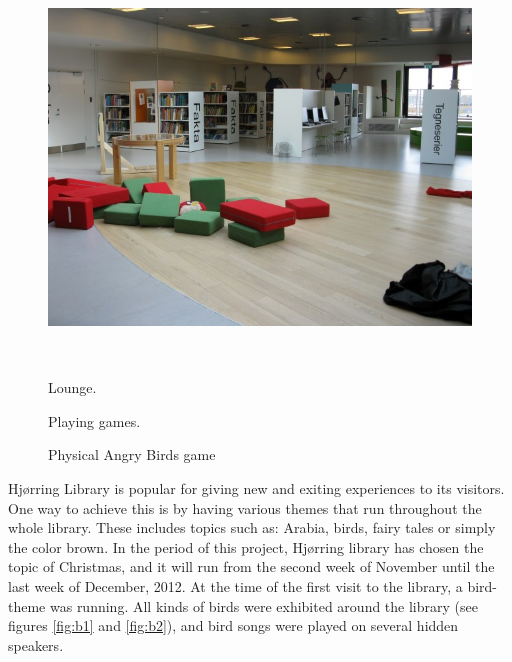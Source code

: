 \begin{figure}[htbp]
\begin{minipage}[b]{0.3\textwidth}
		\includegraphics[width=1.00\textwidth]{Pictures/HjoerringLibrary/p3.jpg} %
	\end{minipage}\\ %
	\begin{minipage}[t]{0.3\textwidth}
		\caption{Lounge.} %
		\label{fig:p1}
	\end{minipage}\hfill
	\begin{minipage}[t]{0.3\textwidth}
		\caption{Playing games.} %
		\label{fig:p2}
	\end{minipage}\hfill	
	\begin{minipage}[t]{0.3\textwidth}
		\caption{Physical Angry Birds game} %
		\label{fig:p3}
	\end{minipage}
\end{figure}

Hj{\o}rring Library is popular for giving new and exiting experiences to its visitors. One way to achieve this is by having various themes that run throughout the whole library. These includes topics such as: Arabia, birds, fairy tales or simply the color brown. In the period of this project, Hj{\o}rring library has chosen the topic of Christmas, and it will run from the second week of November until the last week of December, 2012. At the time of the first visit to the library, a bird-theme was running. All kinds of birds were exhibited around the library (see figures \ref{fig:b1} and \ref{fig:b2}), and bird songs were played on several hidden speakers.

